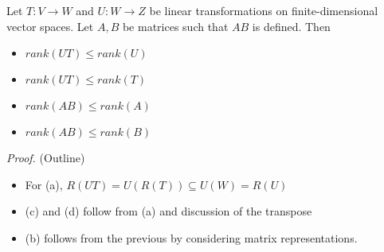 \documentclass[12pt]{article}
\newenvironment{theorem}[2][Theorem]{\begin{trivlist}
\item[\hskip \labelsep {\bfseries #1}\hskip \labelsep {\bfseries #2.}]}{\end{trivlist}}
\begin{document}
\begin{theorem}{3.7}
Let $T : V \to W$ and $U : W \to Z$ be linear transformations on finite-dimensional vector spaces. Let $A, B$ be matrices such that $AB$ is defined. Then

\begin{itemize}
    \item[(a)] $rank(UT) \leq rank(U)$
    
    \item[(b)] $rank(UT) \leq rank(T)$
    
    \item[(c)] $rank(AB) \leq rank(A)$
    
    \item[(d)] $rank(AB) \leq rank(B)$
\end{itemize}
\end{theorem}

\textit{Proof.} (Outline)
\begin{itemize}
    \item For (a), $R(UT) = U(R(T)) \subseteq U(W) = R(U)$
    
    \item (c) and (d) follow from (a) and discussion of the transpose
    
    \item (b) follows from the previous by considering matrix representations.
 \end{itemize}
 
\end{document}
